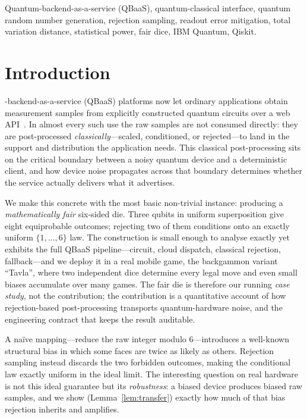 \documentclass[journal]{IEEEtran}
\begin{document}
\begin{IEEEkeywords}
Quantum-backend-as-a-service (QBaaS), quantum-classical interface, quantum random number generation, rejection sampling, readout error mitigation, total variation distance, statistical power, fair dice, IBM Quantum, Qiskit.
\end{IEEEkeywords}

\section{Introduction}

-backend-as-a-service (QBaaS) platforms now let ordinary applications obtain measurement samples from explicitly constructed quantum circuits over a web API~\cite{ibmquantum2024}. In almost every such use the raw samples are not consumed directly: they are post-processed \emph{classically}---scaled, conditioned, or rejected---to land in the support and distribution the application needs. This classical post-processing sits on the critical boundary between a noisy quantum device and a deterministic client, and how device noise propagates across that boundary determines whether the service actually delivers what it advertises.

We make this concrete with the most basic non-trivial instance: producing a \emph{mathematically fair} six-sided die. Three qubits in uniform superposition give eight equiprobable outcomes; rejecting two of them conditions onto an exactly uniform $\{1,\dots,6\}$ law. The construction is small enough to analyse exactly yet exhibits the full QBaaS pipeline---circuit, cloud dispatch, classical rejection, fallback---and we deploy it in a real mobile game, the backgammon variant ``Tavla'', where two independent dice determine every legal move and even small biases accumulate over many games. The fair die is therefore our running \emph{case study}, not the contribution; the contribution is a quantitative account of how rejection-based post-processing transports quantum-hardware noise, and the engineering contract that keeps the result auditable.

A naïve mapping---reduce the raw integer modulo $6$---introduces a well-known structural bias in which some faces are twice as likely as others. Rejection sampling instead discards the two forbidden outcomes, making the conditional law exactly uniform in the ideal limit. The interesting question on real hardware is not this ideal guarantee but its \emph{robustness}: a biased device produces biased raw samples, and we show (Lemma~\ref{lem:transfer}) exactly how much of that bias rejection inherits and amplifies.
\end{document}
